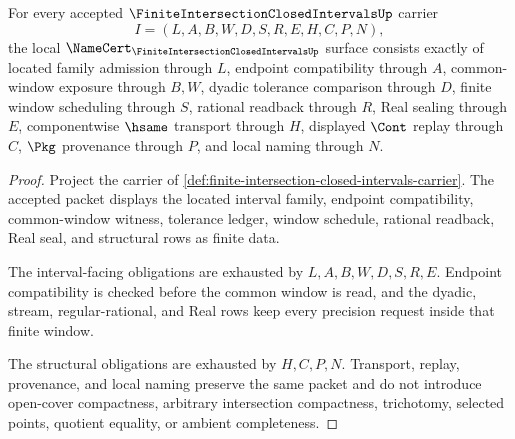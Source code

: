 \begin{theorem}
\label{thm:finite-intersection-closed-intervals-namecert-obligations}
For every accepted $\FiniteIntersectionClosedIntervalsUp$ carrier
$$
I=(L,A,B,W,D,S,R,E,H,C,P,N),
$$
the local $\NameCert_{\FiniteIntersectionClosedIntervalsUp}$ surface consists exactly of located family admission through $L$, endpoint compatibility through $A$, common-window exposure through $B,W$, dyadic tolerance comparison through $D$, finite window scheduling through $S$, rational readback through $R$, Real sealing through $E$, componentwise $\hsame$ transport through $H$, displayed $\Cont$ replay through $C$, $\Pkg$ provenance through $P$, and local naming through $N$.
\end{theorem}
\begin{proof}
Project the carrier of \autoref{def:finite-intersection-closed-intervals-carrier}. The accepted packet displays the located interval family, endpoint compatibility, common-window witness, tolerance ledger, window schedule, rational readback, Real seal, and structural rows as finite data.

The interval-facing obligations are exhausted by $L,A,B,W,D,S,R,E$. Endpoint compatibility is checked before the common window is read, and the dyadic, stream, regular-rational, and Real rows keep every precision request inside that finite window.

The structural obligations are exhausted by $H,C,P,N$. Transport, replay, provenance, and local naming preserve the same packet and do not introduce open-cover compactness, arbitrary intersection compactness, trichotomy, selected points, quotient equality, or ambient completeness.
\end{proof}

